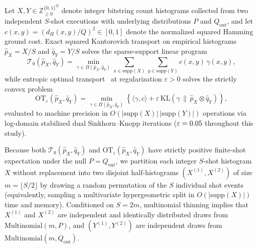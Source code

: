 \documentclass[aps,prapplied,reprint,longbibliography]{revtex4-2}
\begin{document}
Let $X, Y \in \mathbb{Z}_{\ge 0}^{\{0,1\}^Q}$ denote integer bitstring count histograms collected from two independent $S$-shot executions with underlying distributions $P$ and $Q_{\mathrm{out}}$, and let $c(x,y) = (d_H(x,y)/Q)^2 \in [0,1]$ denote the normalized squared Hamming ground cost. Exact squared Kantorovich transport on empirical histograms $\hat{p}_X = X/S$ and $\hat{q}_Y = Y/S$ solves the sparse-support linear program
\begin{equation}
\mathcal{T}_0(\hat{p}_X, \hat{q}_Y) = \min_{\gamma \in \Pi(\hat{p}_X, \hat{q}_Y)} \sum_{x \in \mathrm{supp}(X)} \sum_{y \in \mathrm{supp}(Y)} c(x,y)\,\gamma(x,y),
\label{eq:kantorovich_lp}
\end{equation}
while entropic optimal transport~\cite{cuturi2013sinkhorn,feydy2019interpolating} at regularization $\varepsilon > 0$ solves the strictly convex problem
\begin{equation}
\mathrm{OT}_\varepsilon(\hat{p}_X, \hat{q}_Y) = \min_{\gamma \in \Pi(\hat{p}_X, \hat{q}_Y)} \left\{ \langle \gamma, c \rangle + \varepsilon\,\mathrm{KL}(\gamma \,\|\, \hat{p}_X \otimes \hat{q}_Y) \right\},
\label{eq:entropic_ot}
\end{equation}
evaluated to machine precision in $O(|\mathrm{supp}(X)|\,|\mathrm{supp}(Y)|)$ operations via log-domain stabilized dual Sinkhorn--Knopp iterations ($\varepsilon = 0.05{}$ throughout this study).

Because both $\mathcal{T}_0(\hat{p}_X, \hat{q}_Y)$ and $\mathrm{OT}_\varepsilon(\hat{p}_X, \hat{q}_Y)$ have strictly positive finite-shot expectation under the null $P = Q_{\mathrm{out}}$, we partition each integer $S$-shot histogram $X$ without replacement into two disjoint half-histograms $(X^{(1)}, X^{(2)})$ of size $m = \lfloor S/2 \rfloor$ by drawing a random permutation of the $S$ individual shot events (equivalently, sampling a multivariate hypergeometric split in $O(|\mathrm{supp}(X)|)$ time and memory). Conditioned on $S = 2m$, multinomial thinning implies that $X^{(1)}$ and $X^{(2)}$ are independent and identically distributed draws from $\mathrm{Multinomial}(m, P)$, and $(Y^{(1)}, Y^{(2)})$ are independent draws from $\mathrm{Multinomial}(m, Q_{\mathrm{out}})$.
\end{document}
